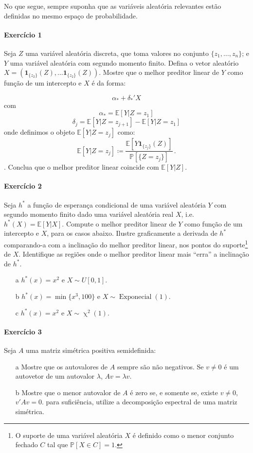 \documentclass[10pt,a4paper]{article}
\title{}
\author{\normalsize Exercícios sobre Modelos Lineares}
\date{}
\begin{document}
	\maketitle
	No que segue, sempre suponha que as variáveis aleatória relevantes estão definidas no mesmo espaço de probabilidade.
 \paragraph{Exercício 1} Seja $Z$ uma variável aleatória discreta, que toma valores no conjunto $\{z_1,\ldots, z_n\}$; e $Y$ uma variável aleatória com segundo momento finito. Defina o vetor aleatório $X  = (\mathbf{1}_{\{z_2\}}(Z),\ldots \mathbf{1}_{\{z_2\}}(Z))$. Mostre que o melhor preditor linear de $Y$ como função de um intercepto e $X$ é da forma:
 
 $$\alpha_* + \delta_*'X$$
 com
 $$ \alpha_* =  \mathbb{E}[Y|Z=z_1]$$
$$\delta_j =   \mathbb{E}[Y|Z=z_{j+1}]-\mathbb{E}[Y|Z=z_1]$$
onde definimos o objeto $\mathbb{E}[Y|Z=z_j]$ como:
$$\mathbb{E}[Y|Z=z_j] \coloneqq \frac{\mathbb{E}[Y\mathbf{1}_{\{z_j\}}(Z)]}{\mathbb{P}[\{Z = z_j\}]}\, .$$. Conclua que o melhor preditor linear coincide com $\mathbb{E}[Y|Z]$.

\paragraph{Exercício 2} Seja $h^*$ a função de esperança condicional de uma variável aleatória $Y$ com segundo momento finito dado uma variável aleatória real $X$, i.e. $h^*(X) = \mathbb{E}[Y|X]$. Compute o melhor preditor linear de $Y$ como função de um intercepto e $X$, para os casos abaixo. Ilustre graficamente a derivada de $h^*$ comparando-a com a inclinação do melhor preditor linear, nos pontos do suporte\footnote{O suporte de uma variável aleatória $X$ é definido como o menor conjunto fechado $C$ tal que $\mathbb{P}[X \in C]=1$.} de $X$. Identifique as regiões onde o melhor preditor linear mais ``erra'' a inclinação de $h^*$.

\begin{itemize}
	\item[a] $h^*(x) = x^2 $ e $X\sim U[0,1]$.
	\item[b] $h^*(x) = \min\{x^3,100\}$ e $X \sim \operatorname{Exponecial}(1)$.
	\item[c] $h^*(x) = x^2$ e $X \sim \operatorname{\chi}^2(1)$.
\end{itemize}

 \paragraph{Exercício 3} Seja $A$ uma matriz simétrica positiva semidefinida:
 \begin{itemize}
 	\item[a] Mostre que os autovalores de $A$ sempre são não negativos.  Se $v\neq 0$ é um autovetor de um autovalor $\lambda$, $Av=\lambda v$.
 	\item[b] Mostre que o menor autovalor de $A$ é zero se, e somente se, existe $v \neq 0$, $v'Av = 0$.  para suficiência, utilize a decomposição espectral de uma matriz simétrica.
 \end{itemize} 
 
\end{document}
